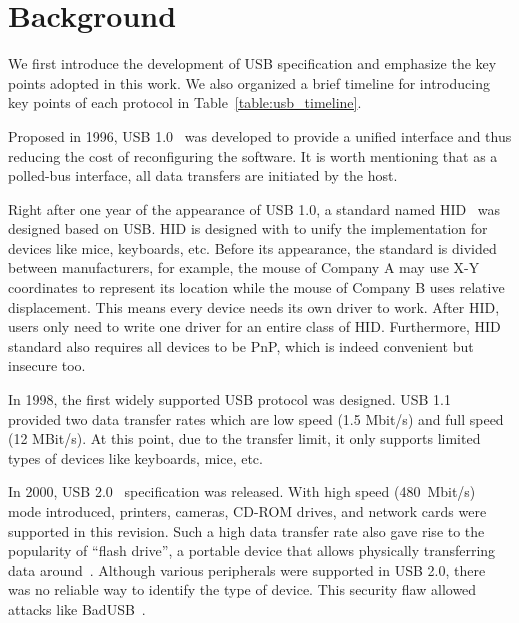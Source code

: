 \section{Background}
\label{sec:background}

We first introduce the development of \ac{USB} specification and emphasize the key
points adopted in this work. We also organized a brief timeline for introducing
key points of each protocol in Table~\ref{table:usb_timeline}.

Proposed in 1996, \ac{USB} 1.0~\cite{usb10} was developed to provide a unified
interface and thus reducing the cost of reconfiguring the software. It is
worth mentioning that as a polled-bus interface, all data transfers are
initiated by the host.

Right after one year of the appearance of \ac{USB} 1.0, a standard named \acf{HID}~\cite{hid} was designed based on \ac{USB}. \ac{HID} is
designed with to unify the implementation for devices like mice,
keyboards, etc. Before its appearance, the standard is divided between
manufacturers, for example, the mouse of Company A may use X-Y coordinates to
represent its location while the mouse of Company B uses relative displacement.
This means every device needs its own driver to work. After \ac{HID}, users only need to
write one driver for an entire class of \acs{HID}. Furthermore, \ac{HID} standard also
requires all devices to be \ac{PnP}, which is indeed
convenient but insecure too.

In 1998, the first widely supported \ac{USB} protocol was designed. \ac{USB} 1.1~\cite{usb11}
provided two data transfer rates which are low speed (1.5 Mbit/s) and full
speed (12 MBit/s). At this point, due to the transfer limit, it only supports
limited types of devices like keyboards, mice, etc.

In 2000, \ac{USB} 2.0~\cite{usb20} specification was released. With high speed \mbox{(480
Mbit/s)} mode introduced, printers, cameras, CD-ROM drives, and network cards were
supported in this revision. Such a high data transfer rate also gave rise to the
popularity of ``flash drive'', a portable device that allows physically
transferring data around~\cite{sok}. Although various peripherals were supported
in \ac{USB} 2.0, there was no reliable way to identify the type of device. This
security flaw allowed attacks like BadUSB~\cite{badusb,rubber}.


